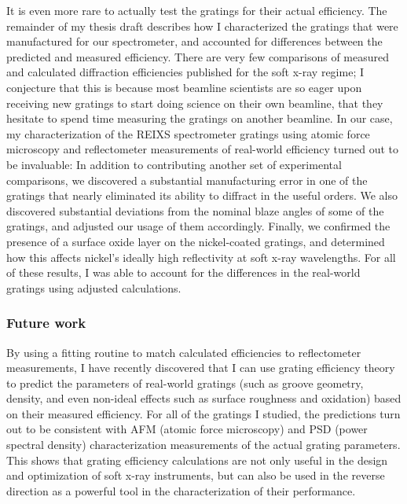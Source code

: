 \documentclass[singlespace,proposal]{uofsthesis-cs}
\begin{document}
It is even more rare to actually test the gratings for their actual efficiency.  The remainder of my thesis draft describes how I characterized the gratings that were manufactured for our spectrometer, and accounted for differences between the predicted and measured efficiency.  There are very few comparisons of measured and calculated diffraction efficiencies published for the soft x-ray regime; I conjecture that this is because most beamline scientists are so eager upon receiving new gratings to start doing science on their own beamline, that they hesitate to spend time measuring the gratings on another beamline.  In our case, my characterization of the REIXS spectrometer gratings using atomic force microscopy and reflectometer measurements of real-world efficiency turned out to be invaluable: In addition to contributing another set of experimental comparisons, we discovered a substantial manufacturing error in one of the gratings that nearly eliminated its ability to diffract in the useful orders.  We also discovered substantial deviations from the nominal blaze angles of some of the gratings, and adjusted our usage of them accordingly.  Finally, we confirmed the presence of a surface oxide layer on the nickel-coated gratings, and determined how this affects nickel's ideally high reflectivity at soft x-ray wavelengths.  For all of these results, I was able to account for the differences in the real-world gratings using adjusted calculations.

\subsubsection{Future work}
By using a fitting routine to match calculated efficiencies to reflectometer measurements, I have recently discovered that I can use grating efficiency theory to predict the parameters of real-world gratings (such as groove geometry, density, and even non-ideal effects such as surface roughness and oxidation) based on their measured efficiency.  For all of the gratings I studied, the predictions turn out to be consistent with AFM (atomic force microscopy) and PSD (power spectral density) characterization measurements of the actual grating parameters.  This shows that grating efficiency calculations are not only useful in the design and optimization of soft x-ray instruments, but can also be used in the reverse direction as a powerful tool in the characterization of their performance.
\end{document}
